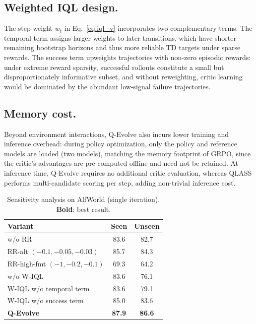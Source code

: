 \subsection{Weighted IQL design.}
The step-weight $w_t$ in Eq.~\ref{eq:iql_v} incorporates two complementary terms.
The temporal term assigns larger weights to later transitions, which have shorter remaining bootstrap horizons and thus more reliable TD targets under sparse rewards.
The success term upweights trajectories with non-zero episodic rewards: under extreme reward sparsity, successful rollouts constitute a small but disproportionately informative subset, and without reweighting, critic learning would be dominated by the abundant low-signal failure trajectories.


\subsection{Memory cost.}
Beyond environment interactions, Q-Evolve also incurs lower training and inference overhead: during policy optimization, only the policy and reference models are loaded (two models), matching the memory footprint of GRPO, since the critic's advantages are pre-computed offline and need not be retained.
At inference time, Q-Evolve requires no additional critic evaluation, whereas QLASS performs multi-candidate scoring per step, adding non-trivial inference cost.

\begin{table}[t]
\centering
\small
\caption{Sensitivity analysis on AlfWorld (single iteration). \textbf{Bold}: best result.}
\setlength{\tabcolsep}{4pt}
\begin{tabular}{lcc}
\toprule
Variant & Seen & Unseen \\
\midrule
w/o RR                    & 83.6 & 82.7 \\
RR-alt $(-0.1,-0.05,-0.03)$  & 85.7 & 84.3 \\
RR-high-fmt $(-1,-0.2,-0.1)$ & 69.3 & 64.2 \\
\midrule
w/o W-IQL                 & 83.6 & 76.1 \\
W-IQL w/o temporal term   & 83.6 & 79.1 \\
W-IQL w/o success term    & 85.0 & 83.6 \\
\midrule
\textbf{Q-Evolve}         & \textbf{87.9} & \textbf{86.6} \\
\bottomrule
\end{tabular}
\label{tab:sensitivity}
\end{table}

